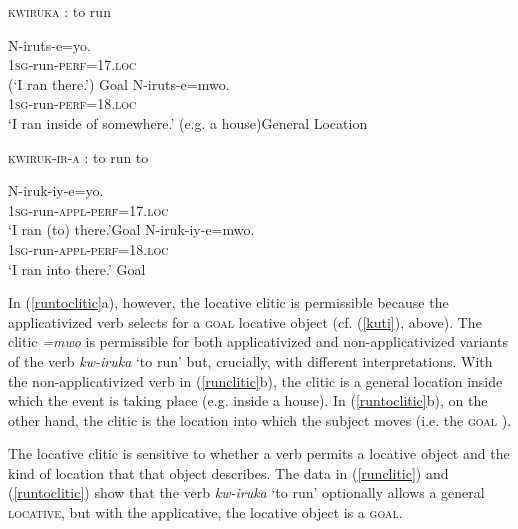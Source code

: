 \documentclass[output=paper]{langsci/langscibook}
\begin{document}
\begin{exe}
      \ex\label{runclitic}{\scshape kwiruka} : to run \begin{xlist}
	      \ex\gll *N-iruts-e=yo.\\
			      1{\scshape sg-}run-{\scshape perf=17.loc}\\
			      \glt (`I ran there.') \hfill *Goal
	      \ex\gll N-iruts-e=mwo. \\
			      1{\scshape sg-}run-{\scshape perf=18.loc}\\
			      \glt `I ran inside of somewhere.' (e.g. a house)\hfill General Location
      \end{xlist}
      \ex\label{runtoclitic}{\scshape kwiruk-ir-a} : to run to\begin{xlist}
	      \ex\gll N-iruk-iy-e=yo.\\
			      1{\scshape sg}-run-{\scshape appl-perf=17.loc}\\
			      \glt `I ran (to) there.'\hfill Goal
	      \ex\gll N-iruk-iy-e=mwo.\\
			      1{\scshape sg}-run-{\scshape appl-perf=18.loc}\\
			      \glt `I ran into there.' \hfill Goal
      \end{xlist}
\end{exe}
In (\ref{runtoclitic}a), however, the locative clitic is permissible because the applicativized verb selects for a {\scshape goal}  locative object (cf. (\ref{kuti}), above). The clitic \emph{=mwo} is permissible for both applicativized and  non-applicativized variants of the verb \emph{kw-iruka} `to run' but, crucially, with different interpretations. With the non-applicativized verb in (\ref{runclitic}b), the clitic is a general location inside which the event is taking place (e.g. inside a house). In (\ref{runtoclitic}b), on the other hand,  the clitic is the location into which the subject moves (i.e. the {\scshape goal} ).  

The locative clitic is sensitive to whether a verb permits a locative object and the kind of location that that object describes. The data in (\ref{runclitic}) and (\ref{runtoclitic}) show that the verb \emph{kw-iruka} `to run' optionally allows a general {\scshape locative}, but with the applicative, the locative object is a {\scshape goal}.
\end{document}
